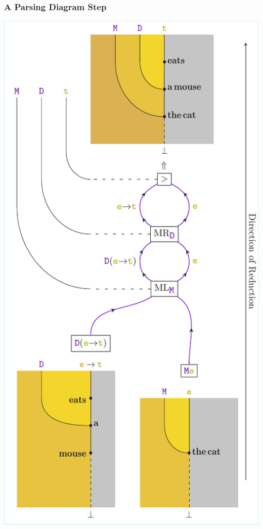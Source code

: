 \documentclass[math, english, info]{beamercours}
\begin{document}
\begin{frame}
	\frametitle{A Parsing Diagram Step}
	\centering
	\includegraphics[height=.8\textheight]{aux/figures/parsing-diagram.pdf}
\end{frame}
\end{document}
